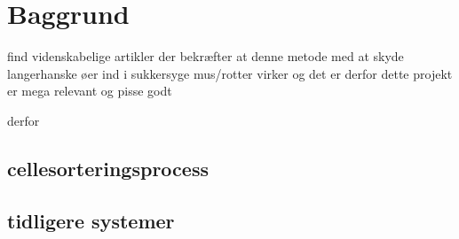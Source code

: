  \section{Baggrund}
 find videnskabelige artikler der bekræfter at denne metode med at skyde langerhanske øer ind i sukkersyge mus/rotter virker og det er derfor dette projekt er mega relevant og pisse godt
 
 derfor
 
 \subsection{cellesorteringsprocess}
 \subsection{tidligere systemer}